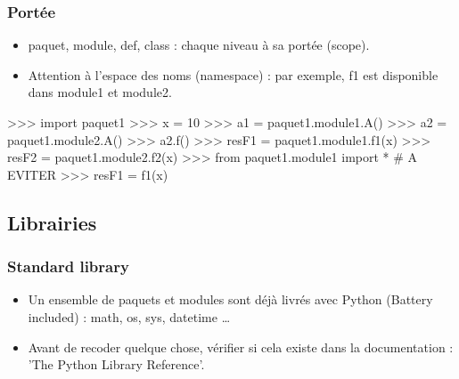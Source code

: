 \begin{frame}[fragile]
\frametitle{Portée}
\begin{minipage}[c]{3cm}
\end{minipage}
\begin{minipage}[c]{6cm}
\begin{itemize}
 \item paquet, module, def, class : chaque niveau à sa portée (scope).
 \item Attention à l'espace des noms (namespace) : par exemple, f1 est disponible dans module1 et module2.    
\end{itemize}
\begin{pythonConsole}
>>> import paquet1
>>> x = 10
>>> a1 = paquet1.module1.A()
>>> a2 = paquet1.module2.A()
>>> a2.f()
>>> resF1 = paquet1.module1.f1(x)
>>> resF2 = paquet1.module2.f2(x)
>>> from paquet1.module1 import * # A EVITER
>>> resF1 = f1(x)
\end{pythonConsole}
\end{minipage}
\end{frame}
\subsection{Librairies}
\begin{frame}
\frametitle{Standard library}
\begin{itemize}
    \item Un ensemble de paquets et modules sont déjà livrés avec Python (Battery included) : math, os, sys, datetime \dots
    \item Avant de recoder quelque chose, vérifier si cela existe dans la documentation : 'The Python Library Reference'. 
\end{itemize}
\end{frame}
